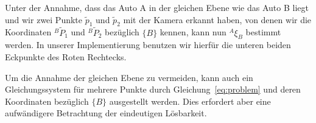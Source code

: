 Unter der Annahme, dass das Auto A in der gleichen Ebene wie das Auto B liegt und wir zwei Punkte $\tilde{p}_1$ und $\tilde{p}_2$ mit der Kamera erkannt haben, von denen wir die Koordinaten $^B\tilde{P}_1$ und $^B\tilde{P}_2$ bezüglich $\{B\}$ kennen, kann nun $^A\xi_B$ bestimmt werden. In unserer Implementierung benutzen wir hierfür die unteren beiden Eckpunkte des Roten Rechtecks.

Um die Annahme der gleichen Ebene zu vermeiden, kann auch ein Gleichungssystem für mehrere Punkte durch Gleichung~\ref{eq:problem} und deren Koordinaten bezüglich $\{B\}$ ausgestellt werden. Dies erfordert aber eine aufwändigere Betrachtung der eindeutigen Lösbarkeit.

